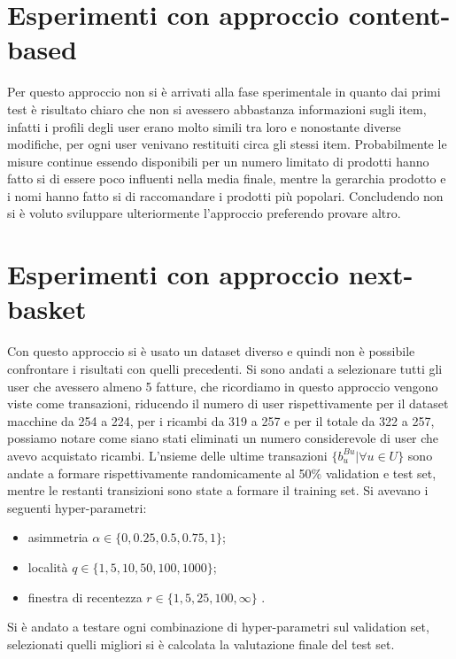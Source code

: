 \section{Esperimenti con approccio content-based}
Per questo approccio non si è arrivati alla fase sperimentale in quanto dai primi test è risultato chiaro che non si avessero abbastanza informazioni sugli item, infatti i profili degli user erano molto simili tra loro e nonostante diverse modifiche, per ogni user venivano restituiti circa gli stessi item. Probabilmente le misure continue essendo disponibili per un numero limitato di prodotti hanno fatto si di essere poco influenti nella media finale, mentre la gerarchia prodotto e i nomi hanno fatto si di raccomandare i prodotti più popolari. Concludendo non si è voluto sviluppare ulteriormente l'approccio preferendo provare altro.

\section{Esperimenti con approccio next-basket}
Con questo approccio si è usato un dataset diverso e quindi non è possibile confrontare i risultati con quelli precedenti. Si sono andati a selezionare tutti gli user che avessero almeno 5 fatture, che ricordiamo in questo approccio vengono viste come transazioni, riducendo il numero di user rispettivamente per il dataset macchine da 254 a 224, per i ricambi da 319 a 257 e per il totale da 322 a 257, possiamo notare come siano stati eliminati un numero considerevole di user che avevo acquistato ricambi. L'nsieme delle ultime transazioni $\{b_{u}^{Bu}| \forall u \in U\}$ sono andate a formare rispettivamente randomicamente al 50\% validation e test set, mentre le restanti transizioni sono state a formare il training set. 
\newpage
Si avevano i seguenti hyper-parametri:
\begin{itemize}
    \item asimmetria $\alpha \in \{0, 0.25, 0.5, 0.75, 1\}$;
    \item località $q \in \{1, 5, 10, 50, 100, 1000\}$;
    \item finestra di recentezza $r \in \{1, 5, 25, 100, \infty \}$ .
\end{itemize}

Si è andato a testare ogni combinazione di hyper-parametri sul validation set, selezionati quelli migliori si è calcolata la valutazione finale del test set.
